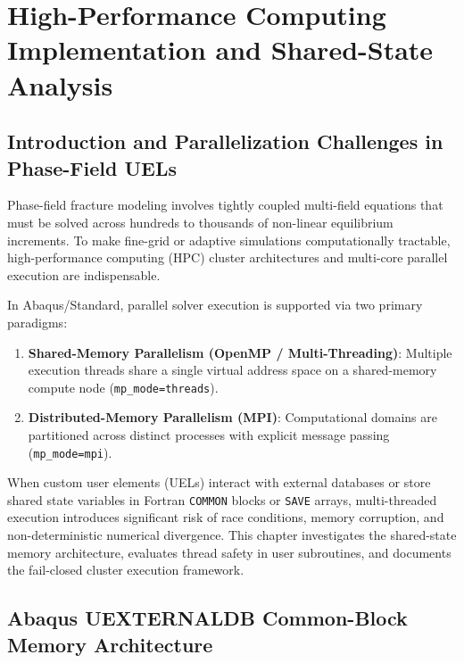\chapter{High-Performance Computing Implementation and Shared-State Analysis}
\label{chap:hpc_parallelization}

\section{Introduction and Parallelization Challenges in Phase-Field UELs}
\label{sec:hpc_intro}

Phase-field fracture modeling involves tightly coupled multi-field equations that must be solved across hundreds to thousands of non-linear equilibrium increments. To make fine-grid or adaptive simulations computationally tractable, high-performance computing (HPC) cluster architectures and multi-core parallel execution are indispensable.

In Abaqus/Standard, parallel solver execution is supported via two primary paradigms:
\begin{enumerate}
    \item \textbf{Shared-Memory Parallelism (OpenMP / Multi-Threading)}: Multiple execution threads share a single virtual address space on a shared-memory compute node (\texttt{mp\_mode=threads}).
    \item \textbf{Distributed-Memory Parallelism (MPI)}: Computational domains are partitioned across distinct processes with explicit message passing (\texttt{mp\_mode=mpi}).
\end{enumerate}

When custom user elements (UELs) interact with external databases or store shared state variables in Fortran \texttt{COMMON} blocks or \texttt{SAVE} arrays, multi-threaded execution introduces significant risk of race conditions, memory corruption, and non-deterministic numerical divergence. This chapter investigates the shared-state memory architecture, evaluates thread safety in user subroutines, and documents the fail-closed cluster execution framework.

\section{Abaqus UEXTERNALDB Common-Block Memory Architecture}
\label{sec:hpc_common_block_architecture}

